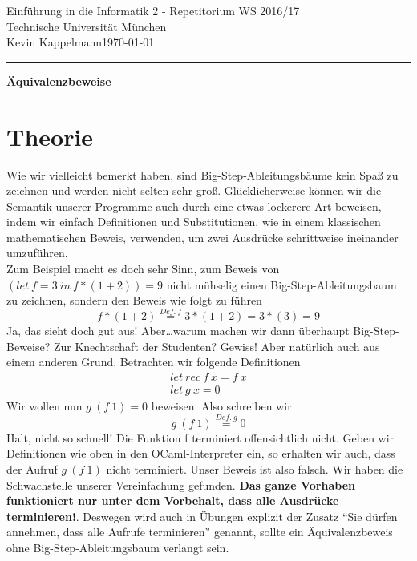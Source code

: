 \documentclass[hidelinks]{article}
\theoremstyle{plain}
\theoremstyle{definition}
\theoremstyle{rem}
\begin{document}

\begin{sloppypar}
\begingroup  
  \LARGE Einführung in die Informatik 2 - Repetitorium WS 2016/17\\Technische Universität München\\[0.5em]
  \large{Kevin Kappelmann\hfill \today}\\
\endgroup
\hrule height 1pt
	{\LARGE{{\begin{center}\textbf{Äquivalenzbeweise}\end{center}}}}
\section{Theorie}
	Wie wir vielleicht bemerkt haben, sind Big-Step-Ableitungsbäume kein Spaß zu zeichnen und werden nicht selten sehr groß. Glücklicherweise können wir die Semantik unserer Programme auch durch eine etwas lockerere Art beweisen, indem wir einfach Definitionen und Substitutionen, wie in einem klassischen mathematischen Beweis, verwenden, um zwei Ausdrücke schrittweise ineinander umzuführen.\\
Zum Beispiel macht es doch sehr Sinn, zum Beweis von $(let\ f=3\ in\ f*(1+2))=9$ nicht mühselig einen Big-Step-Ableitungsbaum zu zeichnen, sondern den Beweis wie folgt zu führen
\begin{equation*}
	f*(1+2)\stackrel{Def.\ f}{=}3*(1+2)=3*(3)=9
\end{equation*}
Ja, das sieht doch gut aus! Aber\ldots warum machen wir dann überhaupt Big-Step-Beweise? Zur Knechtschaft der Studenten? Gewiss! Aber natürlich auch aus einem anderen Grund. Betrachten wir folgende Definitionen
\begin{align*}
	let\ rec\ f\ x = f\ x\\
	let\ g\ x = 0
\end{align*}
Wir wollen nun $g\ (f\ 1)=0$ beweisen. Also schreiben wir
\begin{equation*}
	g\ (f\ 1)\stackrel{Def.\ g}{=}0
\end{equation*}
Halt, nicht so schnell! Die Funktion f terminiert offensichtlich nicht. Geben wir Definitionen wie oben in den OCaml-Interpreter ein, so erhalten wir auch, dass der Aufruf $g\ (f\ 1)$ nicht terminiert.
Unser Beweis ist also falsch. Wir haben die Schwachstelle unserer Vereinfachung gefunden. \textbf{Das ganze Vorhaben funktioniert nur unter dem Vorbehalt, dass alle Ausdrücke terminieren!}. Deswegen wird auch in Übungen explizit der Zusatz ``Sie dürfen annehmen, dass alle Aufrufe terminieren'' genannt, sollte ein Äquivalenzbeweis ohne Big-Step-Ableitungsbaum verlangt sein.


\end{sloppypar}
\end{document}
